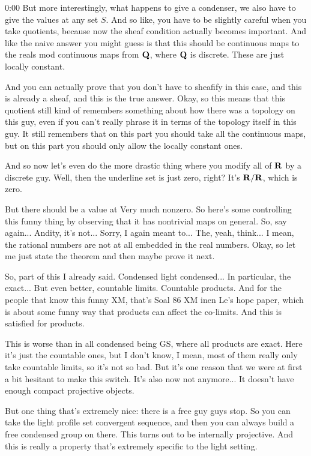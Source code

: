 \begin{unfinished}{0:00}
But more interestingly, what happens to give a condenser, we also have to give the values at any set $S$. And so like, you have to be slightly careful when you take quotients, because now the sheaf condition actually becomes important. And like the naive answer you might guess is that this should be continuous maps to the reals mod continuous maps from $\mathbf Q$, where $\mathbf Q$ is discrete. These are just locally constant.

And you can actually prove that you don't have to sheafify in this case, and this is already a sheaf, and this is the true answer. Okay, so this means that this quotient still kind of remembers something about how there was a topology on this guy, even if you can't really phrase it in terms of the topology itself in this guy. It still remembers that on this part you should take all the continuous maps, but on this part you should only allow the locally constant ones.

And so now let's even do the more drastic thing where you modify all of $\mathbf R$ by a discrete guy. Well, then the underline set is just zero, right? It's $\mathbf R/\mathbf R$, which is zero.

But there should be a value at 
Very much nonzero. So here's some controlling this funny thing by observing that it has nontrivial maps on general. So, say again... Andity, it's not... Sorry, I again meant to... The, yeah, think... I mean, the rational numbers are not at all embedded in the real numbers. Okay, so let me just state the theorem and then maybe prove it next.

So, part of this I already said. Condensed light condensed... In particular, the exact... But even better, countable limits. Countable products. And for the people that know this funny XM, that's Soal 86 XM inen Le's hope paper, which is about some funny way that products can affect the co-limits. And this is satisfied for products.

This is worse than in all condensed being GS, where all products are exact. Here it's just the countable ones, but I don't know, I mean, most of them really only take countable limits, so it's not so bad. But it's one reason that we were at first a bit hesitant to make this switch. It's also now not anymore... It doesn't have enough compact projective objects.

But one thing that's extremely nice: there is a free guy guys stop. So you can take the light profile set convergent sequence, and then you can always build a free condensed group on there. This turns out to be internally projective. And this is really a property that's extremely specific to the light setting.


\end{unfinished}
